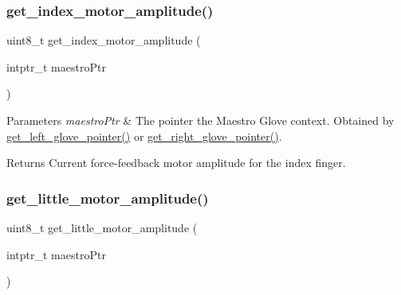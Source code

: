 \subsubsection{\texorpdfstring{get\+\_\+index\+\_\+motor\+\_\+amplitude()}{get\_index\_motor\_amplitude()}}
{\footnotesize\ttfamily uint8\+\_\+t get\+\_\+index\+\_\+motor\+\_\+amplitude (\begin{DoxyParamCaption}\item[{intptr\+\_\+t}]{maestro\+Ptr }\end{DoxyParamCaption})}


\begin{DoxyParams}{Parameters}
{\em maestro\+Ptr} & The pointer the Maestro Glove context. Obtained by \hyperlink{group__glove_management_ga63ce3c99d4a8b8db851b22af9185764e}{get\+\_\+left\+\_\+glove\+\_\+pointer()} or \hyperlink{group__glove_management_ga9b8fd9d91aeac3f8da50f7a7eba0c32b}{get\+\_\+right\+\_\+glove\+\_\+pointer()}. \\
\hline
\end{DoxyParams}
\begin{DoxyReturn}{Returns}
Current force-\/feedback motor amplitude for the index finger. 
\end{DoxyReturn}
\mbox{\label{group__force_feedback_control_ga2c77aacc777827da2ac43e0e171d65f0}} 
\subsubsection{\texorpdfstring{get\+\_\+little\+\_\+motor\+\_\+amplitude()}{get\_little\_motor\_amplitude()}}
{\footnotesize\ttfamily uint8\+\_\+t get\+\_\+little\+\_\+motor\+\_\+amplitude (\begin{DoxyParamCaption}\item[{intptr\+\_\+t}]{maestro\+Ptr }\end{DoxyParamCaption})}


